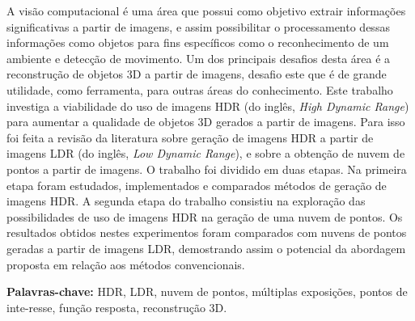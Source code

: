 A visão computacional é uma área que possui como objetivo extrair informações significativas a partir de imagens, e assim possibilitar o processamento dessas informações como objetos para fins específicos como o reconhecimento de um ambiente e detecção de movimento. Um dos principais desafios desta área é a reconstrução de objetos 3D a partir de imagens, desafio este que é de grande utilidade, como ferramenta, para outras áreas do conhecimento. Este trabalho investiga a viabilidade do uso de imagens HDR (do inglês, \textit{High Dynamic Range}) para aumentar a qualidade de objetos 3D gerados a partir de imagens. Para isso foi feita a revisão da literatura sobre geração de imagens HDR a partir de imagens LDR (do inglês, \textit{Low Dynamic Range}), e sobre a obtenção de nuvem de pontos a partir de imagens. O trabalho foi dividido em duas etapas. Na primeira etapa foram estudados, implementados e comparados métodos de geração de imagens HDR. A segunda etapa do trabalho consistiu na exploração das possibilidades de uso de imagens HDR na geração de uma nuvem de pontos. Os resultados obtidos nestes experimentos foram comparados com nuvens de pontos geradas a partir de imagens LDR, demostrando assim o potencial da abordagem proposta em relação aos métodos convencionais.

\textbf{Palavras-chave:} HDR, LDR, nuvem de pontos, múltiplas exposições, pontos de inte-resse, função resposta, reconstrução 3D. 